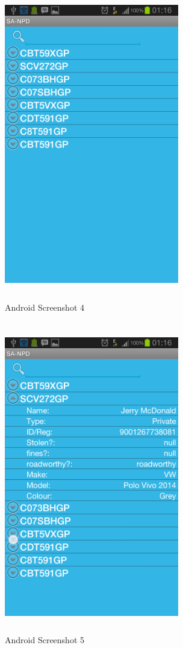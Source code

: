 \documentclass[12pt]{article}
\begin{document}
							\begin{figure}[tp]
		                             \centering
		                             \includegraphics[width=3in, height=5.333in]{Pictures/Interface_4.png}
		                             \caption{Android Screenshot 4}
		              		\end{figure}  
		              		\begin{figure}[tp]
                             		\centering
                             		\includegraphics[width=3in, height=5.333in]{Pictures/Interface_5.png}
                            		\caption{Android Screenshot 5}
           				   	\end{figure}
\end{document}
